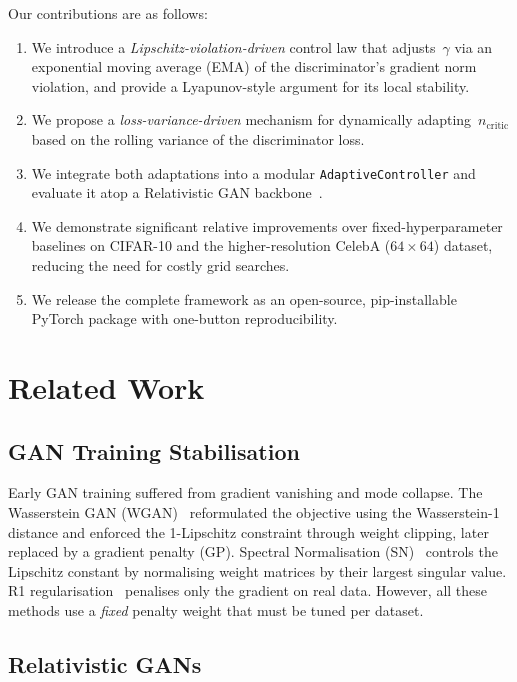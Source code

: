 \documentclass[journal]{IEEEtran}
\newcommand{\ncritic}{n_{\mathrm{critic}}}
\begin{document}
Our contributions are as follows:
\begin{enumerate}
    \item We introduce a \emph{Lipschitz-violation-driven} control law that adjusts~$\gamma$ via an exponential moving average (EMA) of the discriminator's gradient norm violation, and provide a Lyapunov-style argument for its local stability.
    \item We propose a \emph{loss-variance-driven} mechanism for dynamically adapting~$\ncritic$ based on the rolling variance of the discriminator loss.
    \item We integrate both adaptations into a modular \texttt{AdaptiveController} and evaluate it atop a Relativistic GAN backbone~\cite{jolicoeur2019relativistic}.
    \item We demonstrate significant relative improvements over fixed-hyperparameter baselines on CIFAR-10 and the higher-resolution CelebA ($64{\times}64$) dataset, reducing the need for costly grid searches.
    \item We release the complete framework as an open-source, pip-installable PyTorch package with one-button reproducibility.
\end{enumerate}

\section{Related Work}
\label{sec:related}

\subsection{GAN Training Stabilisation}

Early GAN training suffered from gradient vanishing and mode collapse. The Wasserstein GAN (WGAN)~\cite{gulrajani2017improved} reformulated the objective using the Wasserstein-1 distance and enforced the 1-Lipschitz constraint through weight clipping, later replaced by a gradient penalty (GP). Spectral Normalisation (SN)~\cite{miyato2018spectral} controls the Lipschitz constant by normalising weight matrices by their largest singular value. R1 regularisation~\cite{mescheder2018training} penalises only the gradient on real data. However, all these methods use a \emph{fixed} penalty weight that must be tuned per dataset.

\subsection{Relativistic GANs}
\end{document}
